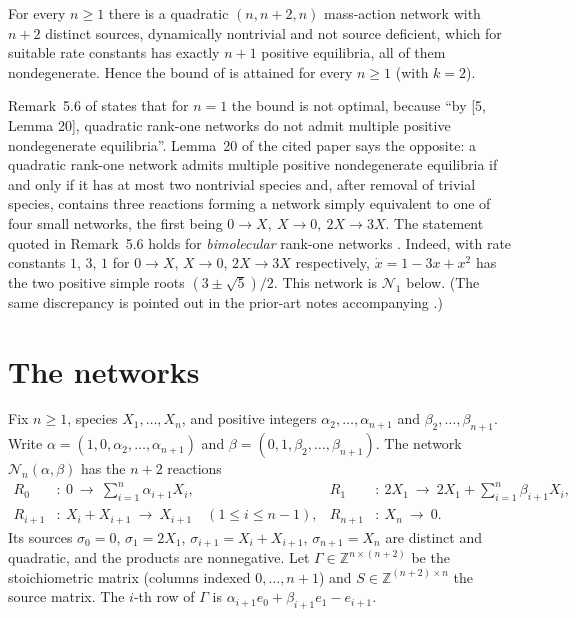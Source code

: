 \documentclass[11pt,a4paper]{report}
\newcommand{\Net}{\mathcal N}
\begin{document}
\begin{theorem}\label{thm:main}
For every \(n\ge1\) there is a quadratic \((n,n+2,n)\) mass-action network with \(n+2\) distinct sources, dynamically
nontrivial and not source deficient, which for suitable rate constants has exactly \(n+1\) positive equilibria, all of
them nondegenerate. Hence the bound of \autocite[Theorem~5.5]{BanajiFeliu2026} is attained for every \(n\ge1\) (with
\(k=2\)).
\end{theorem}

\begin{remark}[note=on Remark~5.6 of \autocite{BanajiFeliu2026}]
Remark~5.6 of \autocite{BanajiFeliu2026} states that for \(n=1\) the bound is not optimal, because ``by [5, Lemma 20],
quadratic rank-one networks do not admit multiple positive nondegenerate equilibria''. Lemma~20 of the cited paper
\autocite{BBH2024ND} says the opposite: a quadratic rank-one network admits multiple positive nondegenerate equilibria
if and only if it has at most two nontrivial species and, after removal of trivial species, contains three reactions
forming a network simply equivalent to one of four small networks, the first being \(0\to X,\ X\to0,\ 2X\to3X\). The
statement quoted in Remark~5.6 holds for \emph{bimolecular} rank-one networks \autocite[Corollary~19]{BBH2024ND}.
Indeed, with rate constants \(1\), \(3\), \(1\) for \(0\to X\), \(X\to0\), \(2X\to3X\) respectively,
\(\dot x=1-3x+x^2\) has the two positive simple roots \((3\pm\sqrt5)/2\). This network is \(\Net_1\) below. (The
same discrepancy is pointed out in the prior-art notes accompanying \autocite{Anon2026}.)
\end{remark}

\section{The networks}\label{sec:networks}

Fix \(n\ge1\), species \(X_1,\dots,X_n\), and positive integers \(\alpha_2,\dots,\alpha_{n+1}\) and
\(\beta_2,\dots,\beta_{n+1}\). Write \(\alpha=(1,0,\alpha_2,\dots,\alpha_{n+1})\) and \(\beta=(0,1,\beta_2,\dots,\beta_{n+1})\).
The network \(\Net_n(\alpha,\beta)\) has the \(n+2\) reactions
\[
\begin{aligned}
R_0&:\ 0\ \longrightarrow\ \textstyle\sum_{i=1}^n\alpha_{i+1}X_i, &
R_1&:\ 2X_1\ \longrightarrow\ 2X_1+\textstyle\sum_{i=1}^n\beta_{i+1}X_i,\\
R_{i+1}&:\ X_i+X_{i+1}\ \longrightarrow\ X_{i+1}\quad(1\le i\le n-1), &
R_{n+1}&:\ X_n\ \longrightarrow\ 0 .
\end{aligned}
\]
Its sources \(\sigma_0=0\), \(\sigma_1=2X_1\), \(\sigma_{i+1}=X_i+X_{i+1}\), \(\sigma_{n+1}=X_n\) are distinct and quadratic,
and the products are nonnegative. Let \(\Gamma\in\mathbb Z^{n\times(n+2)}\) be the stoichiometric matrix (columns indexed
\(0,\dots,n+1\)) and \(S\in\mathbb Z^{(n+2)\times n}\) the source matrix. The \(i\)-th row of \(\Gamma\) is
\(\alpha_{i+1}e_0+\beta_{i+1}e_1-e_{i+1}\).
\end{document}
